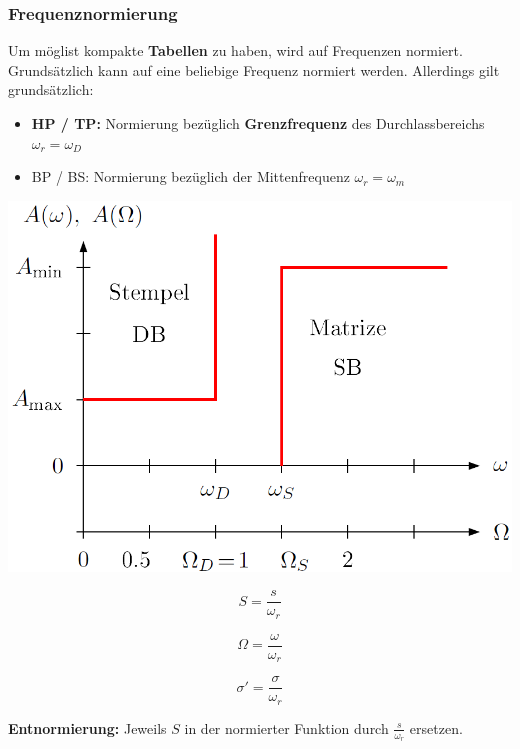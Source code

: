 \subsubsection{Frequenznormierung}
\label{Frequenznormierung}
 
Um möglist kompakte \textbf{Tabellen} zu haben, wird auf Frequenzen normiert. Grundsätzlich kann auf eine beliebige Frequenz normiert
werden. Allerdings gilt grundsätzlich:

\begin{itemize}
    \item \textbf{HP / TP:} Normierung bezüglich \textbf{Grenzfrequenz} des Durchlassbereichs $\omega_r = \omega_D$
    \item BP / BS: Normierung bezüglich der Mittenfrequenz $\omega_r = \omega_m$
\end{itemize}
\vspace{0.2cm}

\begin{minipage}[c]{0.48\columnwidth}
    \includegraphics[width=\columnwidth]{images/filter_toleranzschema_frequenznormierung.png}
\end{minipage}
\hfill
\begin{minipage}[c]{0.48\columnwidth}
    \begin{center}
       \textbf{}  
    \end{center}

    \vspace{-0.3cm}
    \begin{minipage}[c]{0.3\columnwidth}
        $$ \boxed{ S = \frac{s}{\omega_r}} $$
    \end{minipage}
    \hfill
    \begin{minipage}[c]{0.3\columnwidth}
        $$ \boxed{ \Omega = \frac{\omega}{\omega_r}} $$
    \end{minipage}
    \hfill
    \begin{minipage}[c]{0.3\columnwidth}
        $$ \boxed{ \sigma' = \frac{\sigma}{\omega_r}} $$ 
    \end{minipage}

    \vspace{0.2cm}
    \textbf{Entnormierung:} Jeweils $S$ in der normierter Funktion durch $\frac{s}{\omega_r}$ ersetzen.
\end{minipage}


